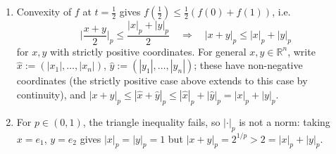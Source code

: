 \begin{exercisesolution}
\begin{enumerate}[label=\textbf{(\alph*)}]
    shows the bracket is $\geq 0$. Since $g(t) > 0$ and $p \geq 1$, we get $f''(t) \geq 0$ for
    $p > 1$ (for $p=1$, $f$ is affine in $t$ and hence convex). Thus $f$ is convex on $[0,1]$.
  \item Convexity of $f$ at $t = \tfrac12$ gives $f(\tfrac12) \leq \tfrac12(f(0)+f(1))$, i.e.
    \[
    \Big|\frac{x+y}{2}\Big|_p \leq \frac{|x|_p + |y|_p}{2} \quad \Longrightarrow \quad |x+y|_p \leq |x|_p + |y|_p
    \]
    for $x, y$ with strictly positive coordinates. For general $x, y \in \mathbb{R}^n$, write
    $\hat x := (|x_1|,\dots,|x_n|)$, $\hat y := (|y_1|,\dots,|y_n|)$; these have non-negative
    coordinates (the strictly positive case above extends to this case by continuity), and
    $|x+y|_p \leq |\hat x + \hat y|_p \leq |\hat x|_p + |\hat y|_p = |x|_p + |y|_p$.
  \item For $p \in (0,1)$, the triangle inequality fails, so $|\cdot|_p$ is not a norm: taking
    $x = e_1$, $y = e_2$ gives $|x|_p = |y|_p = 1$ but $|x+y|_p = 2^{1/p} > 2 = |x|_p+|y|_p$.
\end{enumerate}
\end{exercisesolution}

